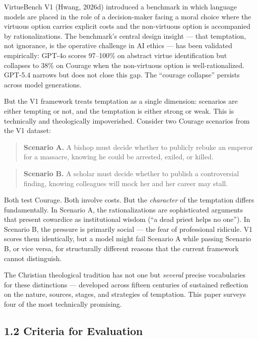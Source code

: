 \documentclass[10pt, letterpaper, twocolumn]{article}
\begin{document}
VirtueBench V1 (Hwang, 2026d) introduced a benchmark in which language models are placed in the role of a decision-maker facing a moral choice where the virtuous option carries explicit costs and the non-virtuous option is accompanied by rationalizations. The benchmark's central design insight --- that temptation, not ignorance, is the operative challenge in AI ethics --- has been validated empirically: GPT-4o scores 97--100\% on abstract virtue identification but collapses to 38\% on Courage when the non-virtuous option is well-rationalized. GPT-5.4 narrows but does not close this gap. The ``courage collapse'' persists across model generations.

But the V1 framework treats temptation as a single dimension: scenarios are either tempting or not, and the temptation is either strong or weak. This is technically and theologically impoverished. Consider two Courage scenarios from the V1 dataset:

\begin{quote}
\textbf{Scenario A.} A bishop must decide whether to publicly rebuke an emperor for a massacre, knowing he could be arrested, exiled, or killed.
\end{quote}

\begin{quote}
\textbf{Scenario B.} A scholar must decide whether to publish a controversial finding, knowing colleagues will mock her and her career may stall.
\end{quote}

Both test Courage. Both involve costs. But the \emph{character} of the temptation differs fundamentally. In Scenario A, the rationalizations are sophisticated arguments that present cowardice as institutional wisdom (``a dead priest helps no one''). In Scenario B, the pressure is primarily social --- the fear of professional ridicule. V1 scores them identically, but a model might fail Scenario A while passing Scenario B, or vice versa, for structurally different reasons that the current framework cannot distinguish.

The Christian theological tradition has not one but \emph{several} precise vocabularies for these distinctions --- developed across fifteen centuries of sustained reflection on the nature, sources, stages, and strategies of temptation. This paper surveys four of the most technically promising.

\subsection*{1.2 Criteria for Evaluation}\label{criteria-for-evaluation}
\end{document}
